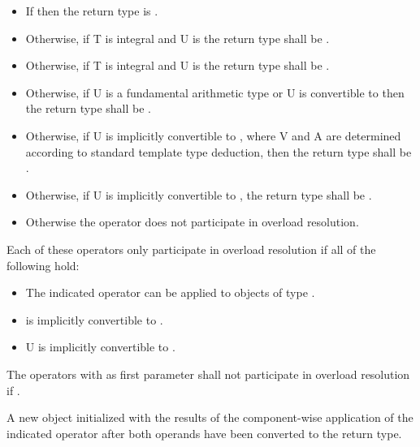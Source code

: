 \begin{itemdescr}
\begin{itemize}
    \item If 
      then the return type is .
    \item Otherwise, if \type T is integral and \type U is \intt
      the return type shall be \datapar{}.
    \item Otherwise, if \type T is integral and \type U is \uint
      the return type shall be \datapar{}.
    \item Otherwise, if \type U is a fundamental arithmetic type or \type U is convertible to \intt
      then the return type shall be .
    \item Otherwise, if \type U is implicitly convertible to \datapar{}, where \type V and \type A are determined according to standard template type deduction,
      then the return type shall be .
    \item Otherwise, if \type U is implicitly convertible to \datapar{},
      the return type shall be \datapar{}.
    \item Otherwise the operator does not participate in overload resolution.%
  \end{itemize}

  \pnum\remarks Each of these operators only participate in overload resolution if all of the following hold:
  \begin{itemize}
    \item The indicated operator can be applied to objects of type \dataparreturntype{}\code{::}.
    \item \datapar{} is implicitly convertible to \dataparreturntype.
    \item \type U is implicitly convertible to \dataparreturntype.
  \end{itemize}

  \pnum\remarks The operators with  as first parameter shall not participate in overload resolution if .

  \pnum\returns A new \datapar object initialized with the results of the component-wise application of the indicated operator after both operands have been converted to the return type.
\end{itemdescr}

